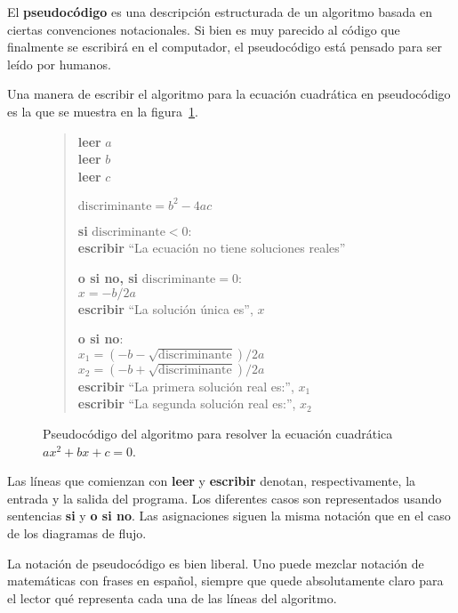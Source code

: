 El \textbf{pseudocódigo} es una descripción estructurada de un algoritmo
basada en ciertas convenciones notacionales. Si bien es muy parecido al
código que finalmente se escribirá en el computador, el pseudocódigo
está pensado para ser leído por humanos.

Una manera de escribir el algoritmo para la ecuación cuadrática en
pseudocódigo es la que se muestra en la figura~\ref{fig:pseudocodigo-cuadratica}.

\begin{figure}
  \centering
  \begin{verse}
    \textbf{leer} \(a\)\\
    \textbf{leer} \(b\)\\
    \textbf{leer} \(c\)

    \(\text{discriminante} = b^2 - 4ac\)

    \textbf{si} \(\text{discriminante} < 0\):\\
        \textbf{escribir} ``La ecuación no tiene soluciones reales''

    \textbf{o si no, si} \(\text{discriminante} = 0\):\\
        \(x = -b / 2a\)\\
        \textbf{escribir} ``La solución única es'', \(x\)

    \textbf{o si no}:\\
        \(x_1 = (-b - \sqrt{\text{discriminante}}) / 2a\)\\
        \(x_2 = (-b + \sqrt{\text{discriminante}}) / 2a\)\\
        \textbf{escribir} ``La primera solución real es:'', \(x_1\)\\
        \textbf{escribir} ``La segunda solución real es:'', \(x_2\)
  \end{verse}
  \caption{Pseudocódigo del algoritmo para resolver
    la ecuación cuadrática \(ax^2 + bx + c = 0\).}
  \label{fig:pseudocodigo-cuadratica}
\end{figure}

Las líneas que comienzan con \textbf{leer} y \textbf{escribir}
denotan, respectivamente, la entrada y la salida del programa. Los
diferentes casos son representados usando sentencias \textbf{si} y
\textbf{o si no}. Las asignaciones siguen la misma notación que en el
caso de los diagramas de flujo.

La notación de pseudocódigo es bien liberal. Uno puede mezclar notación
de matemáticas con frases en español, siempre que quede absolutamente
claro para el lector qué representa cada una de las líneas del
algoritmo.

